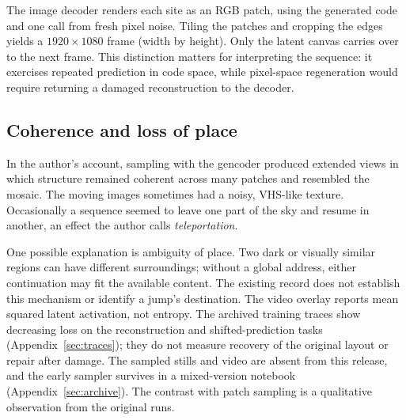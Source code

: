 The image decoder renders each site as an RGB patch, using the generated code and one call from fresh pixel noise. Tiling the patches and cropping the edges yields a $1920\times1080$ frame (width by height). Only the latent canvas carries over to the next frame. This distinction matters for interpreting the sequence: it exercises repeated prediction in code space, while pixel-space regeneration would require returning a damaged reconstruction to the decoder.

\subsection{Coherence and loss of place}

In the author's account, sampling with the gencoder produced extended views in which structure remained coherent across many patches and resembled the mosaic. The moving images sometimes had a noisy, VHS-like texture. Occasionally a sequence seemed to leave one part of the sky and resume in another, an effect the author calls \emph{teleportation}.

One possible explanation is ambiguity of place. Two dark or visually similar regions can have different surroundings; without a global address, either continuation may fit the available content. The existing record does not establish this mechanism or identify a jump's destination. The video overlay reports mean squared latent activation, not entropy. The archived training traces show decreasing loss on the reconstruction and shifted-prediction tasks (Appendix~\ref{sec:traces}); they do not measure recovery of the original layout or repair after damage. The sampled stills and video are absent from this release, and the early sampler survives in a mixed-version notebook (Appendix~\ref{sec:archive}). The contrast with patch sampling is a qualitative observation from the original runs.
